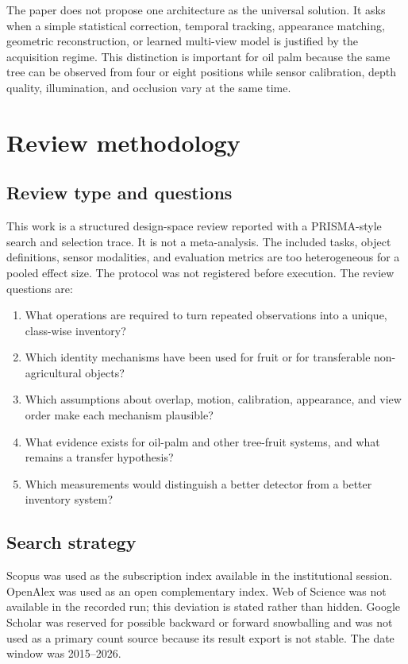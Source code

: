 The paper does not propose one architecture as the universal solution. It asks when a simple statistical correction, temporal tracking, appearance matching, geometric reconstruction, or learned multi-view model is justified by the acquisition regime. This distinction is important for oil palm because the same tree can be observed from four or eight positions while sensor calibration, depth quality, illumination, and occlusion vary at the same time.


\section{Review methodology}
\label{sec:protocol}

\subsection{Review type and questions}

This work is a structured design-space review reported with a PRISMA-style search and selection trace. It is not a meta-analysis. The included tasks, object definitions, sensor modalities, and evaluation metrics are too heterogeneous for a pooled effect size. The protocol was not registered before execution. The review questions are:

\begin{enumerate}[leftmargin=*,itemsep=1pt]
  \item What operations are required to turn repeated observations into a unique, class-wise inventory?
  \item Which identity mechanisms have been used for fruit or for transferable non-agricultural objects?
  \item Which assumptions about overlap, motion, calibration, appearance, and view order make each mechanism plausible?
  \item What evidence exists for oil-palm and other tree-fruit systems, and what remains a transfer hypothesis?
  \item Which measurements would distinguish a better detector from a better inventory system?
\end{enumerate}

\subsection{Search strategy}

Scopus was used as the subscription index available in the institutional session. OpenAlex was used as an open complementary index. Web of Science was not available in the recorded run; this deviation is stated rather than hidden. Google Scholar was reserved for possible backward or forward snowballing and was not used as a primary count source because its result export is not stable. The date window was 2015--2026.

